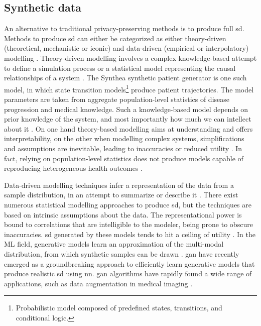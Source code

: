    \subsection{Synthetic data}
        An alternative to traditional privacy-preserving methods is to produce full \gls{sd}. Methods to produce \gls{sd} can either be categorized as either theory-driven (theoretical, mechanistic or iconic) and data-driven (empirical or interpolatory) modelling \cite{Kim_2017, Hand2019}. Theory-driven modelling involves a complex knowledge-based attempt to define a simulation process or a statistical model representing the causal relationships of a system \cite{Yousefi2018-dy, Kansal2018-dx}. The Synthea \cite{Walonoski_2017} synthetic patient generator is one such model, in which state transition models\footnote{Probabilistic model composed of predefined states, transitions, and conditional logic.} produce patient trajectories. The model parameters are taken from aggregate population-level statistics of disease progression and medical knowledge. Such a knowledge-based model depends on prior knowledge of the system, and most importantly how much we can intellect about it \cite{Kim_2017, Bonnery2019-ug}. On one hand theory-based modelling aims at understanding and offers interpretability, on the other when modelling complex systems, simplifications and assumptions are inevitable, leading to inaccuracies or reduced utility \cite{ranHand2019, Rankin2020}. In fact, relying on population-level statistics does not produce models capable of reproducing heterogeneous health outcomes \cite{Chen_2019}.\par
        
        Data-driven modelling techniques infer a representation of the data from a sample distribution, in an attempt to summarize or describe it \cite{Hand2019}. There exist numerous statistical modelling approaches to produce \gls{sd}, but the techniques are based on intrinsic assumptions about the data. The representational power is bound to correlations that are intelligible to the modeler, being prone to obscure inaccuracies. \gls{sd} generated by these models tends to hit a ceiling of utility \cite{Rankin2020}. In the ML field, generative models learn an approximation of the multi-modal distribution, from which synthetic samples can be drawn \cite{goodfellow2016nips}. \Gls{gan} \cite{NIPS2014_5423} have recently emerged as a groundbreaking approach to efficiently learn generative models that produce realistic \gls{sd} using \gls{nn}. \gls{gan} algorithms have rapidly found a wide range of applications, such as data augmentation in medical imaging \cite{Yi2019, Wang2020, Zhou2020}.\par
        
